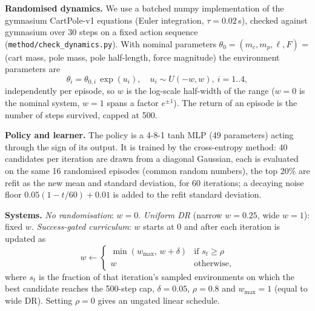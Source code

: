 \textbf{Randomised dynamics.} We use a batched numpy implementation of the gymnasium CartPole-v1 equations (Euler integration, $\tau=0.02$\,s), checked against gymnasium over 30 steps on a fixed action sequence (\texttt{method/check\_dynamics.py}). With nominal parameters $\theta_0=(m_c,m_p,\ell,F)$ = (cart mass, pole mass, pole half-length, force magnitude) the environment parameters are
\begin{equation}
\theta_i=\theta_{0,i}\,\exp(u_i),\quad u_i\sim U(-w,w),\ i=1..4,
\end{equation}
independently per episode, so $w$ is the log-scale half-width of the range ($w=0$ is the nominal system, $w=1$ spans a factor $e^{\pm1}$). The return of an episode is the number of steps survived, capped at 500.

\textbf{Policy and learner.} The policy is a 4-8-1 tanh MLP (49 parameters) acting through the sign of its output. It is trained by the cross-entropy method: 40 candidates per iteration are drawn from a diagonal Gaussian, each is evaluated on the same 16 randomised episodes (common random numbers), the top 20\% are refit as the new mean and standard deviation, for 60 iterations; a decaying noise floor $0.05(1-t/60)+0.01$ is added to the refit standard deviation.

\textbf{Systems.} \emph{No randomisation}: $w=0$. \emph{Uniform DR} (narrow $w=0.25$, wide $w=1$): fixed $w$. \emph{Success-gated curriculum}: $w$ starts at 0 and after each iteration is updated as
\begin{equation}
w\leftarrow\begin{cases}\min(w_{\max},\,w+\delta)&\text{if } s_t\ge\rho\\ w&\text{otherwise,}\end{cases}
\end{equation}
where $s_t$ is the fraction of that iteration's sampled environments on which the best candidate reaches the 500-step cap, $\delta=0.05$, $\rho=0.8$ and $w_{\max}=1$ (equal to wide DR). Setting $\rho=0$ gives an ungated linear schedule.
